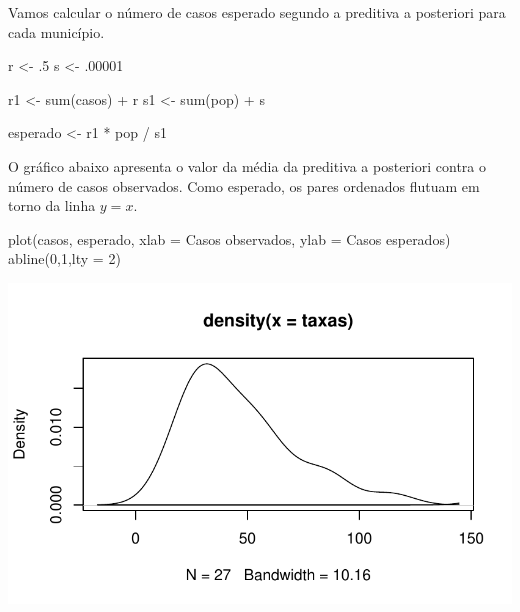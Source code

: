 \documentclass[
  letterpaper,
  DIV=11,
  numbers=noendperiod]{scrreprt}
\newenvironment{Shaded}{\begin{snugshade}}{\end{snugshade}}
\newcommand{\AttributeTok}[1]{\textcolor[rgb]{0.40,0.45,0.13}{#1}}
\newcommand{\DecValTok}[1]{\textcolor[rgb]{0.68,0.00,0.00}{#1}}
\newcommand{\FunctionTok}[1]{\textcolor[rgb]{0.28,0.35,0.67}{#1}}
\newcommand{\NormalTok}[1]{\textcolor[rgb]{0.00,0.23,0.31}{#1}}
\newcommand{\OtherTok}[1]{\textcolor[rgb]{0.00,0.23,0.31}{#1}}
\newcommand{\SpecialCharTok}[1]{\textcolor[rgb]{0.37,0.37,0.37}{#1}}
\newcommand{\StringTok}[1]{\textcolor[rgb]{0.13,0.47,0.30}{#1}}
\theoremstyle{plain}
\theoremstyle{definition}
\theoremstyle{definition}
\theoremstyle{remark}
\begin{document}
Vamos calcular o número de casos esperado segundo a preditiva a
posteriori para cada município.

\begin{Shaded}
\begin{Highlighting}[]
\NormalTok{r }\OtherTok{\textless{}{-}}\NormalTok{ .}\DecValTok{5}
\NormalTok{s }\OtherTok{\textless{}{-}}\NormalTok{ .}\DecValTok{00001}

\NormalTok{r1 }\OtherTok{\textless{}{-}} \FunctionTok{sum}\NormalTok{(casos) }\SpecialCharTok{+}\NormalTok{ r}
\NormalTok{s1 }\OtherTok{\textless{}{-}} \FunctionTok{sum}\NormalTok{(pop) }\SpecialCharTok{+}\NormalTok{ s}

\NormalTok{esperado }\OtherTok{\textless{}{-}}\NormalTok{ r1 }\SpecialCharTok{*}\NormalTok{ pop }\SpecialCharTok{/}\NormalTok{ s1}
\end{Highlighting}
\end{Shaded}

O gráfico abaixo apresenta o valor da média da preditiva a posteriori
contra o número de casos observados. Como esperado, os pares ordenados
flutuam em torno da linha \(y=x\).

\begin{Shaded}
\begin{Highlighting}[]
\FunctionTok{plot}\NormalTok{(casos, esperado, }\AttributeTok{xlab =} \StringTok{\textquotesingle{}Casos observados\textquotesingle{}}\NormalTok{, }\AttributeTok{ylab =} \StringTok{\textquotesingle{}Casos esperados\textquotesingle{}}\NormalTok{)}
\FunctionTok{abline}\NormalTok{(}\DecValTok{0}\NormalTok{,}\DecValTok{1}\NormalTok{,}\AttributeTok{lty =} \DecValTok{2}\NormalTok{)}
\end{Highlighting}
\end{Shaded}

\includegraphics{poisson_files/figure-pdf/unnamed-chunk-6-1.pdf}
\end{document}
